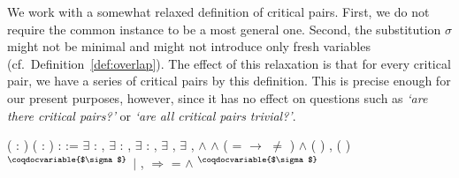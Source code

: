 We work with a somewhat relaxed definition of critical pairs. First,
we do not require the common instance to be a most general
one. Second, the substitution $\sigma$ might not be minimal and might
not introduce only fresh variables
(cf.\ Definition~\ref{def:overlap}). The effect of this relaxation is
that for every critical pair, we have a series of critical pairs by
this \Coq definition. This is precise enough for our present
purposes, however, since it has no effect on questions such as
\emph{`are there critical pairs?'} or \emph{`are all critical pairs
  trivial?'}.
\begin{singlespace}
\begin{coqdoccode}
\coqdocnoindent
{}
( : )
(  :
) : 
:=\coqdoceol
\coqdocindent{1.00em}
\ensuremath{\exists}  :
, \ensuremath{\exists}
 :
,
\ensuremath{\exists}  :
,
\ensuremath{\exists} \coqdocvar{$\sigma$},
\ensuremath{\exists} \coqdocvar{$\tau$},\coqdoceol
\coqdocindent{3.00em}
 \coqdocdefinition{$\in$}
\ensuremath{\land}
 \coqdocdefinition{$\in$}
 \ensuremath{\land}
( = 
\ensuremath{\rightarrow}
 \ensuremath{\not=}
)
\ensuremath{\land}\coqdoceol
\coqdocindent{3.00em}
 (
) ,
 (
)$^{\coqdocvariable{$\sigma$}}$ 
\coqdoceol
\coqdocindent{3.00em}
\ensuremath{|}
,
 \ensuremath{\Rightarrow}
  =
\ensuremath{\land}
$^{\coqdocvariable{$\sigma$}}$ 

\end{coqdoccode}
\end{singlespace}
